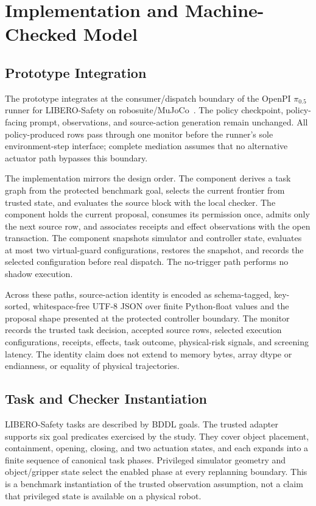 \section{Implementation and Machine-Checked Model}
\label{sec:implementation}

\subsection{Prototype Integration}

The prototype integrates \system at the consumer/dispatch boundary of the
OpenPI $\pi_{0.5}$~\cite{pi05} runner for LIBERO-Safety on
robosuite/MuJoCo~\cite{liberosafety2026,robosuite2020,mujoco2012}.  The
policy checkpoint, policy-facing prompt, observations, and source-action
generation remain unchanged.  All policy-produced rows pass through one monitor
before the runner's sole environment-step interface; complete mediation assumes
that no alternative actuator path bypasses this boundary.

The implementation mirrors the design order.  The \lone component derives a task graph
from the protected benchmark goal, selects the current frontier from trusted
state, and evaluates the source block with the local checker.  The \ltwoa component holds
the current proposal, consumes its permission once, admits only the next source
row, and associates receipts and effect observations with the open transaction.
The \ltwob component snapshots simulator and controller state, evaluates at most two
virtual-guard configurations, restores the snapshot, and records the selected
configuration before real dispatch.  The no-trigger path performs no shadow
execution.

Across these paths, source-action identity is encoded as schema-tagged,
key-sorted, whitespace-free UTF-8 JSON over finite Python-float values and the
proposal shape presented at the protected controller boundary.  The
monitor records the trusted task decision, accepted source rows, selected
execution configurations, receipts, effects, task outcome, physical-risk
signals, and screening latency.  The identity claim does not extend to memory
bytes, array dtype or endianness, or equality of physical trajectories.

\subsection{Task and Checker Instantiation}

LIBERO-Safety tasks are described by BDDL goals.  The trusted adapter supports
six goal predicates exercised by the study.  They cover object placement,
containment, opening, closing, and two actuation states, and each expands into a
finite sequence of canonical task phases.  Privileged simulator geometry and
object/gripper state select the enabled phase at every replanning boundary.  This
is a benchmark instantiation of the trusted observation assumption, not a claim
that privileged state is available on a physical robot.

